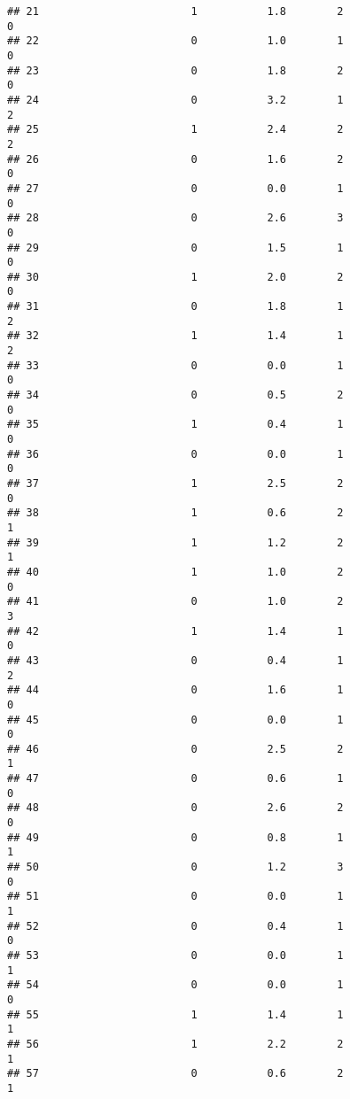 \documentclass[]{article}
\begin{document}
\begin{verbatim}
## 21                        1           1.8        2                 0
## 22                        0           1.0        1                 0
## 23                        0           1.8        2                 0
## 24                        0           3.2        1                 2
## 25                        1           2.4        2                 2
## 26                        0           1.6        2                 0
## 27                        0           0.0        1                 0
## 28                        0           2.6        3                 0
## 29                        0           1.5        1                 0
## 30                        1           2.0        2                 0
## 31                        0           1.8        1                 2
## 32                        1           1.4        1                 2
## 33                        0           0.0        1                 0
## 34                        0           0.5        2                 0
## 35                        1           0.4        1                 0
## 36                        0           0.0        1                 0
## 37                        1           2.5        2                 0
## 38                        1           0.6        2                 1
## 39                        1           1.2        2                 1
## 40                        1           1.0        2                 0
## 41                        0           1.0        2                 3
## 42                        1           1.4        1                 0
## 43                        0           0.4        1                 2
## 44                        0           1.6        1                 0
## 45                        0           0.0        1                 0
## 46                        0           2.5        2                 1
## 47                        0           0.6        1                 0
## 48                        0           2.6        2                 0
## 49                        0           0.8        1                 1
## 50                        0           1.2        3                 0
## 51                        0           0.0        1                 1
## 52                        0           0.4        1                 0
## 53                        0           0.0        1                 1
## 54                        0           0.0        1                 0
## 55                        1           1.4        1                 1
## 56                        1           2.2        2                 1
## 57                        0           0.6        2                 1

\end{verbatim}
\end{document}
